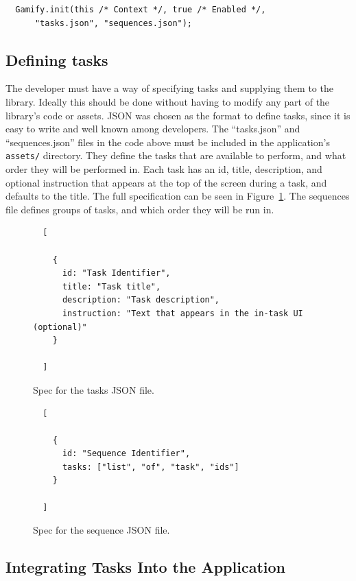 \begin{verbatim}
  Gamify.init(this /* Context */, true /* Enabled */,
      "tasks.json", "sequences.json");
\end{verbatim}

\subsection{Defining tasks}

The developer must have a way of specifying tasks and supplying
them to the library. Ideally this should be done without having
to modify any part of the library's code or assets. JSON was
chosen as the format to define tasks, since it is easy to write
and well known among developers.
The ``tasks.json'' and ``sequences.json'' files in the code
above must be included in the application's \verb+assets/+ directory.
They define the tasks that are available to perform, and what order
they will be performed in.
Each task has an id, title, description, and optional instruction
that appears at the top of the screen during a task, and defaults
to the title. The full specification can be seen in Figure~\ref{fig:task-spec}.
The sequences file defines groups of tasks, and which
order they will be run in.

\begin{figure}[h]
  \begin{verbatim}
  [
  
    {
      id: "Task Identifier", 
      title: "Task title",
      description: "Task description",
      instruction: "Text that appears in the in-task UI (optional)"
    }
    
  ]
  \end{verbatim}
  \label{fig:task-spec}
  \caption{Spec for the tasks JSON file.}
\end{figure}

\begin{figure}[h]
  \begin{verbatim}
  [
  
    {
      id: "Sequence Identifier", 
      tasks: ["list", "of", "task", "ids"]
    }
    
  ]
  \end{verbatim}
  \label{fig:sequence-spec}
  \caption{Spec for the sequence JSON file.}
\end{figure}

\subsection{Integrating Tasks Into the Application}

